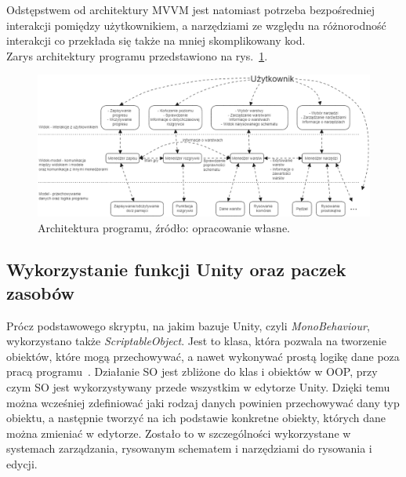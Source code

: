 Odstępstwem od architektury MVVM jest natomiast potrzeba bezpośredniej interakcji pomiędzy użytkownikiem,
a narzędziami ze względu na różnorodność interakcji co przekłada się także na mniej skomplikowany kod.\\
Zarys architektury programu przedstawiono na rys.~\ref{fig:architektura}.

\begin{figure}[h!]
    \centering
    \includegraphics[width=\textwidth]{chapters/chapter3/rys/arch}
    \caption[Architektura programu.]{Architektura programu, źródło: opracowanie własne.}
    \label{fig:architektura}
\end{figure}

\subsection{Wykorzystanie funkcji Unity oraz paczek zasobów}
\label{subsec:zasoby}

Prócz podstawowego skryptu, na jakim bazuje Unity, czyli \textit{MonoBehaviour},
wykorzystano także \textit{ScriptableObject}.
Jest to klasa, która pozwala na tworzenie obiektów, które mogą przechowywać,
a nawet wykonywać prostą logikę dane poza pracą programu~\cite{unity_csharp, scriptable_docs}.
Działanie SO jest zbliżone do klas i obiektów w OOP,
przy czym SO jest wykorzystywany przede wszystkim w edytorze Unity.
Dzięki temu można wcześniej zdefiniować jaki rodzaj danych powinien przechowywać dany typ obiektu,
a następnie tworzyć na ich podstawie konkretne obiekty, których dane można zmieniać w edytorze.
Zostało to w szczególności wykorzystane w systemach zarządzania, rysowanym schematem
i narzędziami do rysowania i edycji.\\
\indent 
